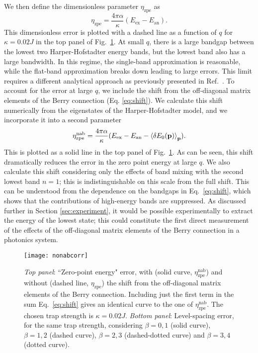 We then define the dimensionless parameter $\eta_{\text{zpe}}$ as 
\begin{equation}
\eta_{\text{zpe}} = \frac{4\pi\alpha}{\kappa} (E_{\text{ex}} -E_{\text{an}}). 
\end{equation}
This dimensionless error is plotted with a dashed line as a function of $q$ for $\kappa=0.02 J$ in the top panel of Fig.~\ref{fig:zpe}. At small $q$, there is a large bandgap between the lowest two Harper-Hofstadter energy bands, but the lowest band also has a large bandwidth. In this regime, the single-band approximation is reasonable, while the flat-band approximation breaks down leading to large errors. This limit requires a different analytical approach as  previously presented in Ref.~\cite{ozawa2014momhh}.
To account for the error at large $q$, we include the shift from the off-diagonal matrix elements of the Berry connection (Eq. \ref{eq:shift}). We calculate this shift numerically from the eigenstates of the Harper-Hofstadter model, and we incorporate it into a second parameter 
\begin{equation}
\eta_{\text{zpe}}^{\text{nab}} = \frac{4\pi\alpha}{\kappa}(E_{\text{ex}} - E_{\text{an}} - \left<\delta  E_0(\mathbf{p})\right>_{\mathbf{p}}).
\end{equation}
This is plotted as a solid line in the top panel of Fig.~\ref{fig:zpe}. As can be seen, this shift dramatically reduces the error in the zero point energy at large $q$. We also calculate this shift considering only the effects of band mixing with the second lowest band $n=1$; this is indistinguishable on this scale from the full shift. This can be understood from the dependence on the bandgaps in Eq.~\ref{eq:shift}, which shows that the contributions of high-energy bands are suppressed. As discussed further in Section \ref{sec:experiment}, it would be possible experimentally to extract the energy of the lowest state; this could constitute the first direct measurement of the effects of the off-diagonal matrix elements of the Berry connection in a photonics system.

\begin{figure}[tb]\centering
  \texttt{[image: nonabcorr]} %
  \caption{\emph{Top panel}: ``Zero-point energy" error, with (solid curve,
    $\eta_{\text{zpe}}^{\text{nab}}$) and without (dashed line,
    $\eta_{\text{zpe}}$) the shift from the off-diagonal matrix elements of the Berry connection. Including just the
    first term in the sum Eq.~\eqref{eq:shift} gives an identical
    curve to the one of $\eta_{\text{zpe}}^{\text{nab}}$. The chosen
    trap strength is $\kappa = 0.02 J$.  \emph{Bottom panel}: Level-spacing
    error, for the same trap strength, considering $\beta = 0,1$
    (solid curve), $\beta = 1,2$ (dashed curve), $\beta = 2,3$
    (dashed-dotted curve) and $\beta = 3,4$ (dotted curve).}
  \label{fig:zpe}
\end{figure}

